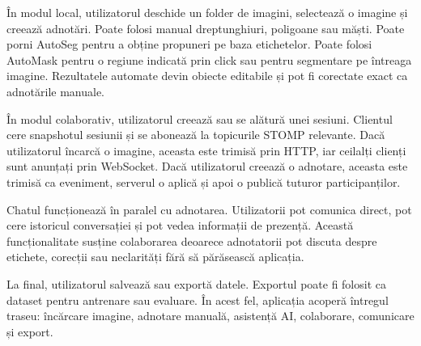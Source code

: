 În modul local, utilizatorul deschide un folder de imagini, selectează o imagine și creează adnotări.
Poate folosi manual dreptunghiuri, poligoane sau măști.
Poate porni AutoSeg pentru a obține propuneri pe baza etichetelor.
Poate folosi AutoMask pentru o regiune indicată prin click sau pentru segmentare pe întreaga imagine.
Rezultatele automate devin obiecte editabile și pot fi corectate exact ca adnotările manuale.

În modul colaborativ, utilizatorul creează sau se alătură unei sesiuni.
Clientul cere snapshotul sesiunii și se abonează la topicurile STOMP relevante.
Dacă utilizatorul încarcă o imagine, aceasta este trimisă prin HTTP, iar ceilalți clienți sunt anunțați prin WebSocket.
Dacă utilizatorul creează o adnotare, aceasta este trimisă ca eveniment, serverul o aplică și apoi o publică tuturor participanților.

Chatul funcționează în paralel cu adnotarea.
Utilizatorii pot comunica direct, pot cere istoricul conversației și pot vedea informații de prezență.
Această funcționalitate susține colaborarea deoarece adnotatorii pot discuta despre etichete, corecții sau neclarități fără să părăsească aplicația.

La final, utilizatorul salvează sau exportă datele.
Exportul poate fi folosit ca dataset pentru antrenare sau evaluare.
În acest fel, aplicația acoperă întregul traseu: încărcare imagine, adnotare manuală, asistență AI, colaborare, comunicare și export.